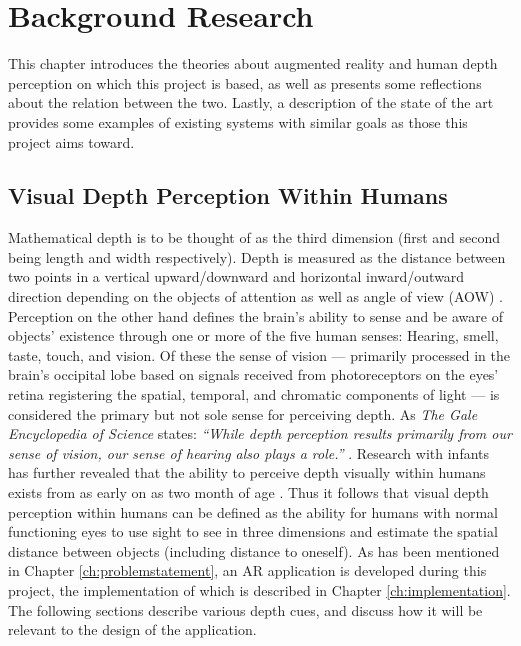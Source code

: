 \chapter{Background Research}\label{ch:backgroundresearch}
This chapter introduces the theories about augmented reality and human depth perception on which this project is based, as well as presents some reflections about the relation between the two. Lastly, a description of the state of the art provides some examples of existing systems with similar goals as those this project aims toward.

\section{Visual Depth Perception Within Humans}
Mathematical depth is to be thought of as the third dimension (first and second being length and width respectively). Depth is measured as the distance between two points in a vertical upward/downward and horizontal inward/outward direction depending on the objects of attention as well as angle of view (AOW) \cite{Gale}. Perception on the other hand defines the brain’s ability to sense and be aware of objects' existence through one or more of the five human senses: Hearing, smell, taste, touch, and vision. Of these the sense of vision --- primarily processed in the brain’s occipital lobe based on signals received from photoreceptors on the eyes’ retina registering the spatial, temporal, and chromatic components of light \cite{Spector2003} --- is considered the primary but not sole sense for perceiving depth. As \textit{The Gale Encyclopedia of Science} states: \textit{“While depth perception results primarily from our sense of vision, our sense of hearing also plays a role.”} \cite{Gale}. Research with infants has further revealed that the ability to perceive depth visually within humans exists from as early on as two month of age \cite{Gale}. Thus it follows that visual depth perception within humans can be defined as the ability for humans with normal functioning eyes to use sight to see in three dimensions and estimate the spatial distance between objects (including distance to oneself). As has been mentioned in Chapter \ref{ch:problemstatement}, an AR application is developed during this project, the implementation of which is described in Chapter \ref{ch:implementation}. The following sections describe various depth cues, and discuss how it will be relevant to the design of the application.

